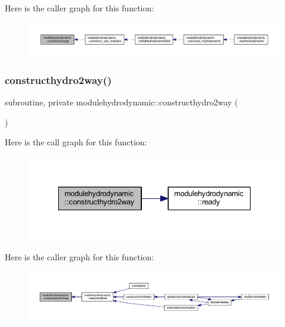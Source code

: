 Here is the caller graph for this function\+:\nopagebreak
\begin{figure}[H]
\begin{center}
\leavevmode
\includegraphics[width=350pt]{namespacemodulehydrodynamic_a048299b4cfb1c4c013ad653ff9e85f70_icgraph}
\end{center}
\end{figure}
\mbox{\label{namespacemodulehydrodynamic_ab991fa8b939ae331f5361fbce83a2ed9}} 
\subsubsection{\texorpdfstring{constructhydro2way()}{constructhydro2way()}}
{\footnotesize\ttfamily subroutine, private modulehydrodynamic\+::constructhydro2way (\begin{DoxyParamCaption}{ }\end{DoxyParamCaption})\hspace{0.3cm}{\ttfamily [private]}}

Here is the call graph for this function\+:\nopagebreak
\begin{figure}[H]
\begin{center}
\leavevmode
\includegraphics[width=335pt]{namespacemodulehydrodynamic_ab991fa8b939ae331f5361fbce83a2ed9_cgraph}
\end{center}
\end{figure}
Here is the caller graph for this function\+:\nopagebreak
\begin{figure}[H]
\begin{center}
\leavevmode
\includegraphics[width=350pt]{namespacemodulehydrodynamic_ab991fa8b939ae331f5361fbce83a2ed9_icgraph}
\end{center}
\end{figure}
\mbox{\label{namespacemodulehydrodynamic_af871717e205963c29069ba0ee23cd512}} 
